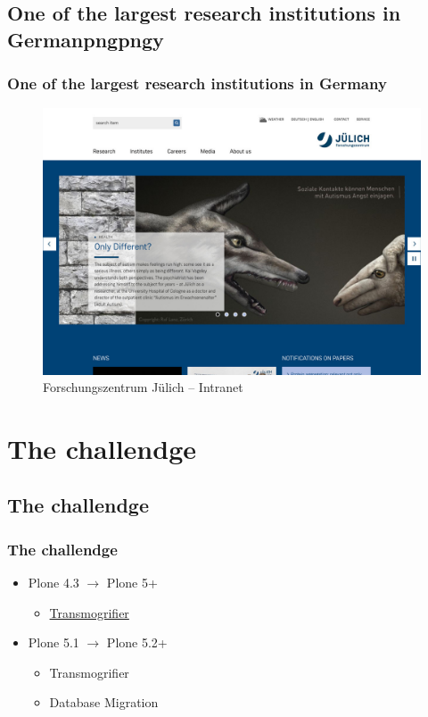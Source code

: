 \documentclass[aspectratio=169]{beamer}
\begin{document}
\subsection{One of the largest research institutions in Germanpngpngy}
\begin{frame}
  \frametitle{One of the largest research institutions in Germany}
  \begin{figure}
    \includegraphics[height=.7\textheight]{./img/005_-_fzj.jpg}
    \caption{Forschungszentrum Jülich -- Intranet}
  \end{figure}
\end{frame}

\section{The challendge}
\subsection{The challendge}
\begin{frame}
  \frametitle{The challendge}
  \begin{itemize}
    \item Plone 4.3 $\rightarrow$ Plone 5+
    \begin{itemize}
      \item \href{https://plone.com/try-plone.html}{Transmogrifier}
    \end{itemize}
    \item Plone 5.1 $\rightarrow$ Plone 5.2+
    \begin{itemize}
      \item Transmogrifier
      \item Database Migration
    \end{itemize}
  \end{itemize}
\end{frame}
\end{document}
